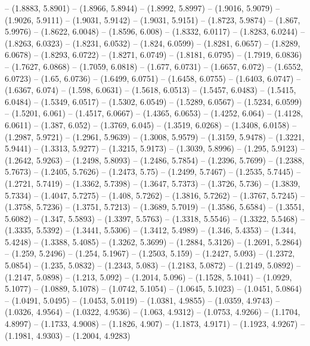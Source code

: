 {   -- (1.8883, 5.8901) -- (1.8966, 5.8944) -- (1.8992, 5.8997) -- (1.9016, 
  5.9079) -- (1.9026, 5.9111) -- (1.9031, 5.9142) -- (1.9031, 5.9151) -- 
  (1.8723, 5.9874) -- (1.867, 5.9976) -- (1.8622, 6.0048) -- (1.8596, 6.008) -- 
  (1.8332, 6.0117) -- (1.8283, 6.0244) -- (1.8263, 6.0323) -- (1.8231, 6.0532) 
  -- (1.824, 6.0599) -- (1.8281, 6.0657) -- (1.8289, 6.0678) -- (1.8293, 6.0722)
   -- (1.8271, 6.0749) -- (1.8181, 6.0795) -- (1.7919, 6.0836) -- (1.7627, 
  6.0868) -- (1.7059, 6.0818) -- (1.677, 6.0731) -- (1.6657, 6.072) -- (1.6552, 
  6.0723) -- (1.65, 6.0736) -- (1.6499, 6.0751) -- (1.6458, 6.0755) -- (1.6403, 
  6.0747) -- (1.6367, 6.074) -- (1.598, 6.0631) -- (1.5618, 6.0513) -- (1.5457, 
  6.0483) -- (1.5415, 6.0484) -- (1.5349, 6.0517) -- (1.5302, 6.0549) -- 
  (1.5289, 6.0567) -- (1.5234, 6.0599) -- (1.5201, 6.061) -- (1.4517, 6.0667) --
   (1.4365, 6.0653) -- (1.4252, 6.064) -- (1.4128, 6.0611) -- (1.387, 6.052) -- 
  (1.3769, 6.045) -- (1.3519, 6.0268) -- (1.3408, 6.0158) -- (1.2987, 5.9721) --
   (1.2961, 5.9639) -- (1.3008, 5.9579) -- (1.3159, 5.9478) -- (1.3221, 5.9441) 
  -- (1.3313, 5.9277) -- (1.3215, 5.9173) -- (1.3039, 5.8996) -- (1.295, 5.9123)
   -- (1.2642, 5.9263) -- (1.2498, 5.8093) -- (1.2486, 5.7854) -- (1.2396, 
  5.7699) -- (1.2388, 5.7673) -- (1.2405, 5.7626) -- (1.2473, 5.75) -- (1.2499, 
  5.7467) -- (1.2535, 5.7445) -- (1.2721, 5.7419) -- (1.3362, 5.7398) -- 
  (1.3647, 5.7373) -- (1.3726, 5.736) -- (1.3839, 5.7334) -- (1.4047, 5.7275) --
   (1.408, 5.7262) -- (1.3816, 5.7262) -- (1.3767, 5.7245) -- (1.3758, 5.7236) 
  -- (1.3751, 5.7213) -- (1.3689, 5.7019) -- (1.3586, 5.6584) -- (1.3551, 
  5.6082) -- (1.347, 5.5893) -- (1.3397, 5.5763) -- (1.3318, 5.5546) -- (1.3322,
   5.5468) -- (1.3335, 5.5392) -- (1.3441, 5.5306) -- (1.3412, 5.4989) -- 
  (1.346, 5.4353) -- (1.344, 5.4248) -- (1.3388, 5.4085) -- (1.3262, 5.3699) -- 
  (1.2884, 5.3126) -- (1.2691, 5.2864) -- (1.259, 5.2496) -- (1.254, 5.1967) -- 
  (1.2503, 5.159) -- (1.2427, 5.093) -- (1.2372, 5.0854) -- (1.235, 5.0832) -- 
  (1.2343, 5.083) -- (1.2183, 5.0872) -- (1.2149, 5.0892) -- (1.2147, 5.0898) --
   (1.213, 5.092) -- (1.2014, 5.096) -- (1.1528, 5.1041) -- (1.0929, 5.1077) -- 
  (1.0889, 5.1078) -- (1.0742, 5.1054) -- (1.0645, 5.1023) -- (1.0451, 5.0864) 
  -- (1.0491, 5.0495) -- (1.0453, 5.0119) -- (1.0381, 4.9855) -- (1.0359, 
  4.9743) -- (1.0326, 4.9564) -- (1.0322, 4.9536) -- (1.063, 4.9312) -- (1.0753,
   4.9266) -- (1.1704, 4.8997) -- (1.1733, 4.9008) -- (1.1826, 4.907) -- 
  (1.1873, 4.9171) -- (1.1923, 4.9267) -- (1.1981, 4.9303) -- (1.2004, 4.9283) 
}

